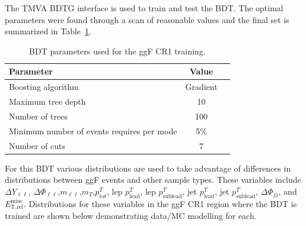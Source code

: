 The TMVA BDTG interface is used to train and test the BDT. The optimal parameters were found through a scan of reasonable values and the final set is summarized in Table~\ref{tab:ggFCR1BDTparameters}.
\begin{table}[h!]
\centering
\begin{tabular}{|l|c|c|}
\hline
Parameter                                    & Value     \\
\hline
Boosting algorithm                           & Gradient \\
Maximum tree depth                           &  10      \\
Number of trees                              &  100    \\
Minimum number of events requires per mode   &  5\%     \\ 
Number of cuts                               &  7       \\
\hline
\end{tabular}
\caption{BDT parameters used for the ggF CR1 training.}
\label{tab:ggFCR1BDTparameters}
\end{table}
For this BDT various distributions are used to take advantage of differences in distributions between ggF events and other sample types. These variables include $\Delta Y_{\ell\ell}$, $\Delta \Phi_{\ell\ell}$,$m_{\ell\ell}$,$m_T$,$p^T_{tot}$, lep $p^T_{\text{lead}}$, lep $p^T_{\text{sublead}}$, jet $p^T_{\text{lead}}$, jet $p^T_{\text{sublead}}$, $\Delta \Phi_{jj}$, and $\ensuremath{E_{\text{T,rel}}^{\text{miss}}}$. Distributions for these variables in the ggF CR1 region where the BDT is trained are shown below demonstrating data/MC modelling for each.

